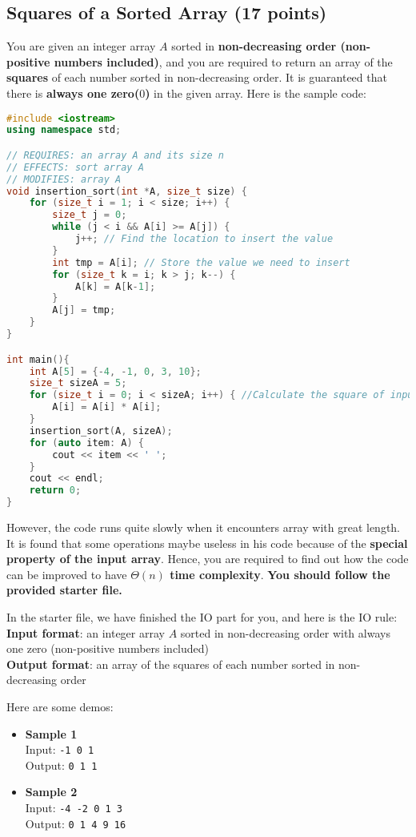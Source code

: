 \documentclass[11pt]{exam}
\begin{document}
\subsection{Squares of a Sorted Array (17 points)}
You are given an integer array $A$ sorted in \textbf{non-decreasing order (non-positive numbers included)},
and you are required to return an array of the \textbf{squares} of each number sorted in non-decreasing order.
It is guaranteed that there is \textbf{always one zero($0$)} in the given array. 
Here is the sample code:
\begin{lstlisting}[language=c++]
#include <iostream>
using namespace std;

// REQUIRES: an array A and its size n
// EFFECTS: sort array A
// MODIFIES: array A
void insertion_sort(int *A, size_t size) {
    for (size_t i = 1; i < size; i++) {
        size_t j = 0;
        while (j < i && A[i] >= A[j]) {
            j++; // Find the location to insert the value
        }
        int tmp = A[i]; // Store the value we need to insert
        for (size_t k = i; k > j; k--) {
            A[k] = A[k-1];
        }
        A[j] = tmp;
    }
}

int main(){
    int A[5] = {-4, -1, 0, 3, 10};
    size_t sizeA = 5;
    for (size_t i = 0; i < sizeA; i++) { //Calculate the square of input array
        A[i] = A[i] * A[i];
    }
    insertion_sort(A, sizeA);
    for (auto item: A) {
        cout << item << ' ';
    }
    cout << endl;
    return 0;
}
\end{lstlisting}

However, the code runs quite slowly when it encounters
array with great length. It is found that some operations maybe useless in his code
because of the \textbf{special property of the input array}.
Hence, you are required to find out how the code can be improved to have \textbf{$\Theta(n)$ time complexity}. \textbf{You should follow the provided starter file.}
\newline

In the starter file, we have finished the IO part for you, and here is the IO rule:\\
\textbf{Input format}: an integer array $A$ sorted in non-decreasing order with always one zero (non-positive numbers included)\\
\textbf{Output format}: an array of the squares of each number sorted in non-decreasing order
\newline
\vspace{0.2cm}

Here are some demos:
\begin{itemize}
    \item \textbf{Sample 1}\\
    Input: \lstinline|-1 0 1| \\
    Output: \lstinline|0 1 1|
    \item \textbf{Sample 2}\\
    Input: \lstinline|-4 -2 0 1 3| \\
    Output: \lstinline|0 1 4 9 16|
\end{itemize}
\end{document}
